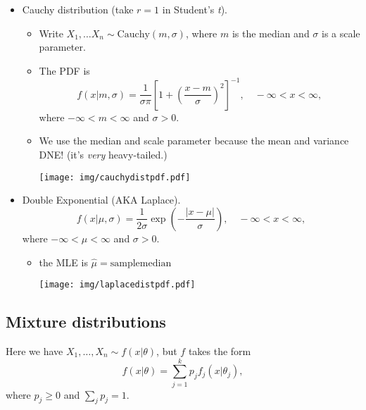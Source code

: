 \documentclass[11pt,english]{scrbook}
\begin{document}
\begin{enumerate}
\begin{itemize}
\item Cauchy distribution (take \(r = 1\) in Student's \emph{t}).
\begin{itemize}
\item Write \(X_{1},\ldots X_{n} \sim \mathrm{Cauchy}(m,\sigma)\), where \(m\) is the median and \(\sigma\) is a scale parameter.
\item The PDF is 
\begin{equation}
f(x|m,\sigma)=\frac{1}{\sigma\pi}\left[1+\left(\frac{x-m}{\sigma}\right)^{2}\right]^{-1},\quad -\infty < x <\infty,
\end{equation}
where \(-\infty < m < \infty\) and \(\sigma > 0\).
\item We use the median and scale parameter because the mean and variance DNE! (it's \emph{very} heavy-tailed.)
\begin{center}
\begin{center}
\texttt{[image: img/cauchydistpdf.pdf]}
\end{center}

\end{center}
\end{itemize}
\end{itemize}



\begin{itemize}
\item Double Exponential (AKA Laplace).
\begin{equation}
f(x|\mu,\sigma)=\frac{1}{2\sigma}\exp\left(-\frac{|x - \mu|}{\sigma}\right),\quad -\infty < x <\infty,
\end{equation}
where \(-\infty < \mu < \infty\) and \(\sigma > 0\). 
\begin{itemize}
\item the MLE is \(\hat{\mu} = \mathrm{sample median}\)
\begin{center}
\begin{center}
\texttt{[image: img/laplacedistpdf.pdf]}
\end{center}

\end{center}
\end{itemize}
\end{itemize}
\end{enumerate}



\subsection{Mixture distributions}
\label{sec:org970fa92}
Here we have \(X_{1},\ldots, X_{n} \sim f(x|\theta)\), but \(f\) takes the form
\[
f(x|\theta) = \sum_{j=1}^{k}p_{j}f_{j}(x|\theta_{j}),
\]
where \(p_{j}\geq 0\) and \(\sum_{j}p_{j}=1\).
\end{document}
